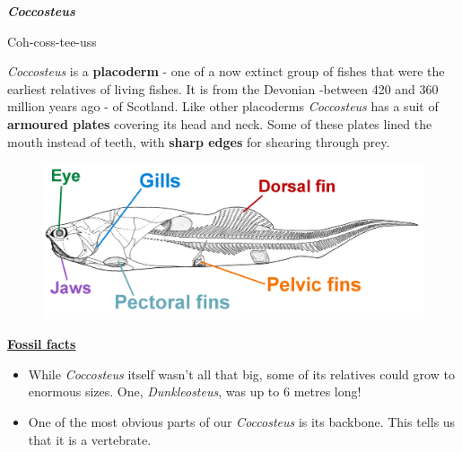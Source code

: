\documentclass[12pt,letterpaper]{extarticle}
\begin{document}

{\Huge\textbf{\textit{Coccosteus}}\par}
\vspace{3mm}
{\large{Coh-coss-tee-uss} \par} 
\vspace{5mm}
\textit{Coccosteus} is a \textbf{placoderm} - one of a now extinct group of fishes that were the earliest relatives of living fishes.  It is from the Devonian -between 420 and 360 million years ago - of Scotland.  Like other placoderms \textit{Coccosteus} has a suit of \textbf{armoured plates} covering its head and neck.  Some of these plates lined the mouth instead of teeth, with \textbf{sharp edges} for shearing through prey. \newline  

\begin{figure}[h!]
\includegraphics[scale=0.5]{Coccosteus}
\centering
\end{figure}

{\large\textbf{\underline{Fossil facts}}\par}

\begin{itemize}
\item While \textit{Coccosteus} itself wasn't all that big, some of its relatives could grow to enormous sizes.  One, \textit{Dunkleosteus}, was up to 6 metres long!
  \item One of the most obvious parts of our \textit{Coccosteus} is its backbone.  This tells us that it is a vertebrate.
\end{itemize}
\end{document}

